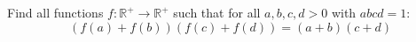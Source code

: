 Find all functions $f\colon\mathbb{R}^{+} \rightarrow \mathbb{R}^{+}$ such that
for all $a,b, c, d > 0$ with $abcd=1$:
$$(f(a)+f(b))(f(c)+f(d))=(a+b)(c+d)$$
